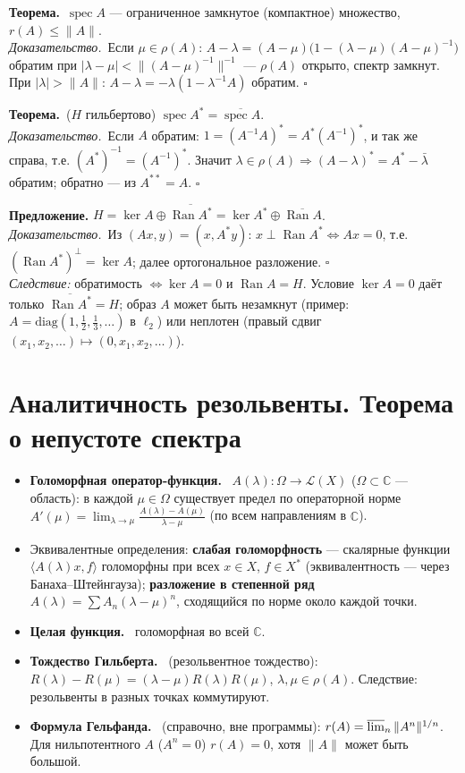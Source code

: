 \documentclass[11pt,a4paper]{article}
\newcommand{\Lc}{\mathcal L}
\newcommand{\CC}{\mathbb C}
\newcommand{\spec}{\operatorname{spec}}
\newcommand{\Ran}{\operatorname{Ran}}
\newcommand{\df}[1]{\textbf{#1.}~}
\newcommand{\thm}{\textbf{Теорема.}~}
\newcommand{\pf}{\textit{Доказательство.}~}
\newcommand{\qedd}{\hfill$\square$}
\begin{document}
\thm $\spec A$ — ограниченное замкнутое (компактное) множество, $r(A)\le\|A\|$.\\
\pf Если $\mu\in\rho(A)$: $A-\lambda=(A-\mu)\bigl(1-(\lambda-\mu)(A-\mu)^{-1}\bigr)$ обратим при $|\lambda-\mu|<\|(A-\mu)^{-1}\|^{-1}$ — $\rho(A)$ открыто, спектр замкнут. При $|\lambda|>\|A\|$: $A-\lambda=-\lambda(1-\lambda^{-1}A)$ обратим. \qedd

\thm ($H$ гильбертово) $\spec A^*=\overline{\spec A}$.\\
\pf Если $A$ обратим: $1=(A^{-1}A)^*=A^*(A^{-1})^*$, и так же справа, т.е. $(A^*)^{-1}=(A^{-1})^*$. Значит $\lambda\in\rho(A)\Rightarrow(A-\lambda)^*=A^*-\bar\lambda$ обратим; обратно — из $A^{**}=A$. \qedd

\textbf{Предложение.} $H=\ker A\oplus\overline{\Ran A^*}=\ker A^*\oplus\overline{\Ran A}$.\\
\pf Из $(Ax,y)=(x,A^*y)$: $x\perp\Ran A^*\iff Ax=0$, т.е. $(\Ran A^*)^\perp=\ker A$; далее ортогональное разложение. \qedd\\
\textit{Следствие:} обратимость $\iff\ker A=0$ и $\Ran A=H$. Условие $\ker A=0$ даёт только $\overline{\Ran A^*}=H$; образ $A$ может быть незамкнут (пример: $A=\mathrm{diag}(1,\frac12,\frac13,\dots)$ в $\ell_2$) или неплотен (правый сдвиг $(x_1,x_2,\dots)\mapsto(0,x_1,x_2,\dots)$).

\section{Аналитичность резольвенты. Теорема о непустоте спектра}
\begin{defs}
\begin{itemize}
\item \df{Голоморфная оператор-функция} $A(\lambda):\Omega\to\Lc(X)$ ($\Omega\subset\CC$ — область): в каждой $\mu\in\Omega$ существует предел по операторной норме $A'(\mu)=\lim_{\lambda\to\mu}\frac{A(\lambda)-A(\mu)}{\lambda-\mu}$ (по всем направлениям в $\CC$).
\item Эквивалентные определения: \textbf{слабая голоморфность} — скалярные функции $\langle A(\lambda)x,f\rangle$ голоморфны при всех $x\in X$, $f\in X^*$ (эквивалентность — через Банаха–Штейнгауза); \textbf{разложение в степенной ряд} $A(\lambda)=\sum A_n(\lambda-\mu)^n$, сходящийся по норме около каждой точки.
\item \df{Целая функция} голоморфная во всей $\CC$.
\item \df{Тождество Гильберта} (резольвентное тождество): $R(\lambda)-R(\mu)=(\lambda-\mu)R(\lambda)R(\mu)$, $\lambda,\mu\in\rho(A)$. Следствие: резольвенты в разных точках коммутируют.
\item \df{Формула Гельфанда} (справочно, вне программы): $r(A)=\varlimsup_{n}\|A^n\|^{1/n}$. Для нильпотентного $A$ ($A^n=0$) $r(A)=0$, хотя $\|A\|$ может быть большой.
\end{itemize}
\end{defs}
\end{document}

